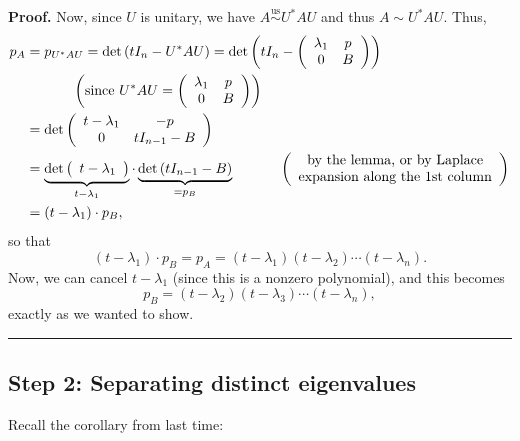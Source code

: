 \documentclass[numbers=enddot,12pt,final,onecolumn,notitlepage]{scrartcl}%
\numberwithin{exer}{subsection}
\theoremstyle{definition}
\newenvironment{proof}[1][Proof]{\noindent\textbf{#1.} }{\ \rule{0.5em}{0.5em}}
\begin{document}
\begin{proof}
Now, since $U$ is unitary, we have $A\overset{\operatorname*{us}}{\sim}%
U^{\ast}AU$ and thus $A\sim U^{\ast}AU$. Thus,%
\begin{align*}
p_{A}  & =p_{U^{\ast}AU}=\det\left(  tI_{n}-U^{\ast}AU\right)  =\det\left(
tI_{n}-\left(
\begin{array}
[c]{cc}%
\lambda_{1} & p\\
0 & B
\end{array}
\right)  \right)  \\
& \ \ \ \ \ \ \ \ \ \ \left(  \text{since }U^{\ast}AU=\left(
\begin{array}
[c]{cc}%
\lambda_{1} & p\\
0 & B
\end{array}
\right)  \right)  \\
& =\det\left(
\begin{array}
[c]{cc}%
t-\lambda_{1} & -p\\
0 & tI_{n-1}-B
\end{array}
\right)  \\
& =\underbrace{\det\left(
\begin{array}
[c]{c}%
t-\lambda_{1}%
\end{array}
\right)  }_{t-\lambda_{1}}\cdot\underbrace{\det\left(  tI_{n-1}-B\right)
}_{=p_{B}}\ \ \ \ \ \ \ \ \ \ \left(
\begin{array}
[c]{c}%
\text{by the lemma, or by Laplace}\\
\text{expansion along the }1\text{st column}%
\end{array}
\right)  \\
& =\left(  t-\lambda_{1}\right)  \cdot p_{B},
\end{align*}
so that%
\[
\left(  t-\lambda_{1}\right)  \cdot p_{B}=p_{A}=\left(  t-\lambda_{1}\right)
\left(  t-\lambda_{2}\right)  \cdots\left(  t-\lambda_{n}\right)  .
\]
Now, we can cancel $t-\lambda_{1}$ (since this is a nonzero polynomial), and
this becomes%
\[
p_{B}=\left(  t-\lambda_{2}\right)  \left(  t-\lambda_{3}\right)
\cdots\left(  t-\lambda_{n}\right)  ,
\]
exactly as we wanted to show.
\end{proof}

\subsection{Step 2: Separating distinct eigenvalues}

Recall the corollary from last time:
\end{document}
